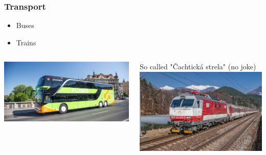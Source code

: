 \documentclass{beamer}
\begin{document}
	\begin{frame}
		\frametitle{Transport}

		\begin{itemize}
			\item Buses
			\pause
			\item Trains
		\end{itemize}

		\pause

		\begin{columns}
		\begin{column}{.5\textwidth}
		\includegraphics[width=\textwidth]{flixbux}
		\end{column}
		
		\begin{column}{.5\textwidth}
		So called "Čachtická strela" (no joke)\\[0.5em]
		\includegraphics[width=\textwidth]{vlak}
		\end{column}
		\end{columns}
	\end{frame}
\end{document}

